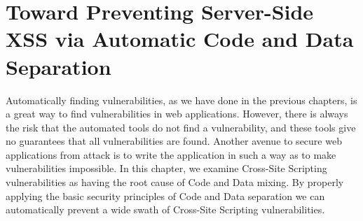 \chapter[Toward Preventing Server-Side XSS]{Toward Preventing Server-Side XSS via Automatic Code and Data Separation}
\label{dedacota}

Automatically finding vulnerabilities, as we have done in the previous
chapters, is a great way to find vulnerabilities in web applications.
However, there is always the risk that the automated tools do not find
a vulnerability, and these tools give no guarantees that all
vulnerabilities are found. Another avenue to secure web applications
from attack is to write the application in such a way as to make
vulnerabilities impossible. In this chapter, we examine Cross-Site
Scripting vulnerabilities as having the root cause of Code and Data
mixing. By properly applying the basic security principles of Code and
Data separation we can automatically prevent a wide swath of
Cross-Site Scripting vulnerabilities. 
\\



